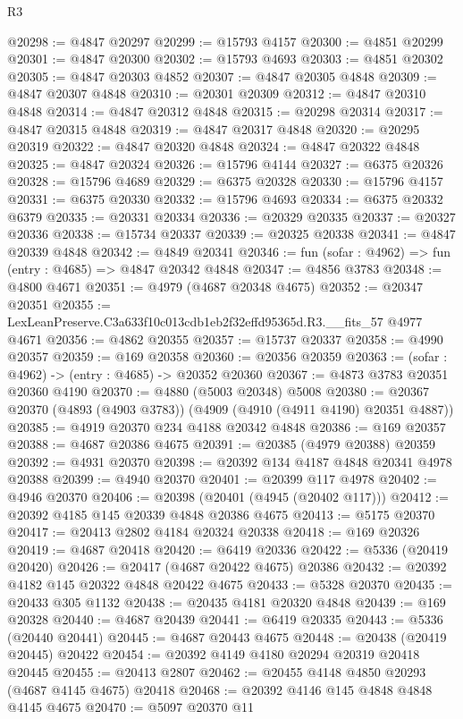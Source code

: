\begin{lexlean}{R3}
\begin{coremodule}
@20298 := @4847 @20297
@20299 := @15793 @4157
@20300 := @4851 @20299
@20301 := @4847 @20300
@20302 := @15793 @4693
@20303 := @4851 @20302
@20305 := @4847 @20303 @4852
@20307 := @4847 @20305 @4848
@20309 := @4847 @20307 @4848
@20310 := @20301 @20309
@20312 := @4847 @20310 @4848
@20314 := @4847 @20312 @4848
@20315 := @20298 @20314
@20317 := @4847 @20315 @4848
@20319 := @4847 @20317 @4848
@20320 := @20295 @20319
@20322 := @4847 @20320 @4848
@20324 := @4847 @20322 @4848
@20325 := @4847 @20324
@20326 := @15796 @4144
@20327 := @6375 @20326
@20328 := @15796 @4689
@20329 := @6375 @20328
@20330 := @15796 @4157
@20331 := @6375 @20330
@20332 := @15796 @4693
@20334 := @6375 @20332 @6379
@20335 := @20331 @20334
@20336 := @20329 @20335
@20337 := @20327 @20336
@20338 := @15734 @20337
@20339 := @20325 @20338
@20341 := @4847 @20339 @4848
@20342 := @4849 @20341
@20346 := fun (sofar : @4962) => fun (entry : @4685) => @4847 @20342 @4848
@20347 := @4856 @3783
@20348 := @4800 @4671
@20351 := @4979 (@4687 @20348 @4675)
@20352 := @20347 @20351
@20355 := LexLeanPreserve.C3a633f10c013cdb1eb2f32effd95365d.R3.__fits_57 @4977 @4671
@20356 := @4862 @20355
@20357 := @15737 @20337
@20358 := @4990 @20357
@20359 := @169 @20358
@20360 := @20356 @20359
@20363 := (sofar : @4962) -> (entry : @4685) -> @20352 @20360
@20367 := @4873 @3783 @20351 @20360 @4190
@20370 := @4880 (@5003 @20348) @5008
@20380 := @20367 @20370 (@4893 (@4903 @3783)) (@4909 (@4910 (@4911 @4190) @20351 @4887))
@20385 := @4919 @20370 @234 @4188 @20342 @4848
@20386 := @169 @20357
@20388 := @4687 @20386 @4675
@20391 := @20385 (@4979 @20388) @20359
@20392 := @4931 @20370
@20398 := @20392 @134 @4187 @4848 @20341 @4978 @20388
@20399 := @4940 @20370
@20401 := @20399 @117 @4978
@20402 := @4946 @20370
@20406 := @20398 (@20401 (@4945 (@20402 @117)))
@20412 := @20392 @4185 @145 @20339 @4848 @20386 @4675
@20413 := @5175 @20370
@20417 := @20413 @2802 @4184 @20324 @20338
@20418 := @169 @20326
@20419 := @4687 @20418
@20420 := @6419 @20336
@20422 := @5336 (@20419 @20420)
@20426 := @20417 (@4687 @20422 @4675) @20386
@20432 := @20392 @4182 @145 @20322 @4848 @20422 @4675
@20433 := @5328 @20370
@20435 := @20433 @305 @1132
@20438 := @20435 @4181 @20320 @4848
@20439 := @169 @20328
@20440 := @4687 @20439
@20441 := @6419 @20335
@20443 := @5336 (@20440 @20441)
@20445 := @4687 @20443 @4675
@20448 := @20438 (@20419 @20445) @20422
@20454 := @20392 @4149 @4180 @20294 @20319 @20418 @20445
@20455 := @20413 @2807
@20462 := @20455 @4148 @4850 @20293 (@4687 @4145 @4675) @20418
@20468 := @20392 @4146 @145 @4848 @4848 @4145 @4675
@20470 := @5097 @20370 @11

\end{coremodule}
\end{lexlean}
